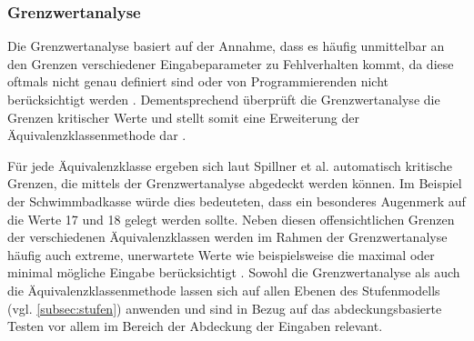 \subsubsection{Grenzwertanalyse}\label{subsub:grenzwertanalyse}

Die Grenzwertanalyse basiert auf der Annahme, dass es häufig unmittelbar an den Grenzen verschiedener Eingabeparameter zu Fehlverhalten kommt, da diese oftmals nicht genau definiert sind oder von Programmierenden nicht berücksichtigt werden \cite[S. 120]{spillner2011software}. Dementsprechend überprüft die Grenzwertanalyse die Grenzen kritischer Werte und stellt somit eine Erweiterung der Äquivalenzklassenmethode dar \cite[S. 120 f.]{spillner2011software}. 

Für jede Äquivalenzklasse ergeben sich laut Spillner et al. \cite[S. 120 f.]{spillner2011software} automatisch kritische Grenzen, die mittels der Grenzwertanalyse abgedeckt werden können. Im Beispiel der Schwimmbadkasse würde dies bedeuteten, dass ein besonderes Augenmerk auf die Werte 17 und 18 gelegt werden sollte. Neben diesen offensichtlichen Grenzen der verschiedenen Äquivalenzklassen werden im Rahmen der Grenzwertanalyse häufig auch extreme, unerwartete Werte wie beispielsweise die maximal oder minimal mögliche Eingabe berücksichtigt \cite[S. 122]{spillner2011software}. Sowohl die Grenzwertanalyse als auch die Äquivalenzklassenmethode lassen sich auf allen Ebenen des Stufenmodells (vgl. \autoref{subsec:stufen}) anwenden und sind in Bezug auf das abdeckungsbasierte Testen vor allem im Bereich der Abdeckung der Eingaben relevant.

